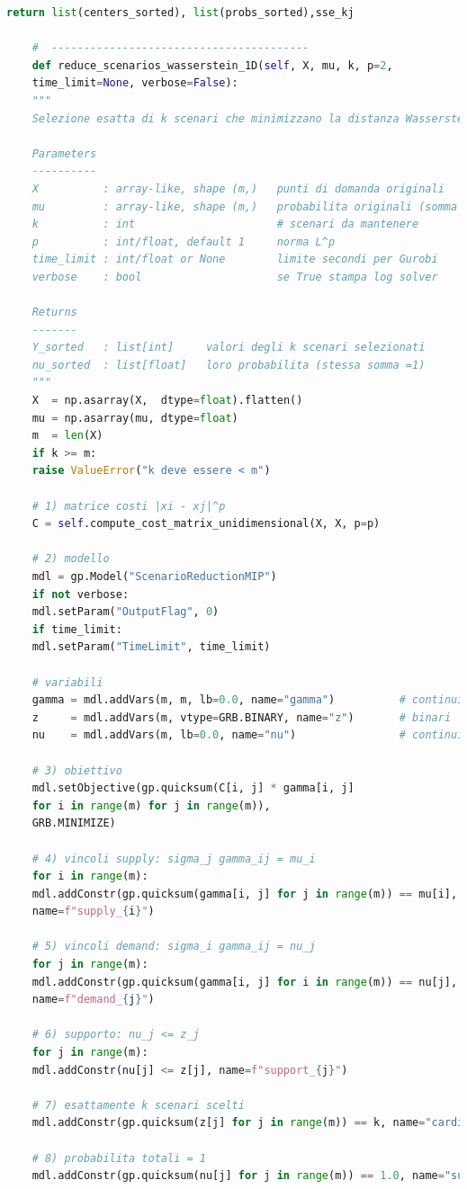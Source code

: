 \documentclass[a4paper,12pt]{article}
\begin{document}
\begin{lstlisting}[language=python,caption={class ScenarioTree},label={lst:class-scenario-tree}]
	return list(centers_sorted), list(probs_sorted),sse_kj
	
	#  ----------------------------------------
	def reduce_scenarios_wasserstein_1D(self, X, mu, k, p=2,
	time_limit=None, verbose=False):
	"""
	Selezione esatta di k scenari che minimizzano la distanza Wasserstein (1-D).
	
	Parameters
	----------
	X          : array-like, shape (m,)   punti di domanda originali
	mu         : array-like, shape (m,)   probabilita originali (somma = 1)
	k          : int                      # scenari da mantenere
	p          : int/float, default 1     norma L^p 
	time_limit : int/float or None        limite secondi per Gurobi
	verbose    : bool                     se True stampa log solver
	
	Returns
	-------
	Y_sorted   : list[int]     valori degli k scenari selezionati
	nu_sorted  : list[float]   loro probabilita (stessa somma =1)
	"""
	X  = np.asarray(X,  dtype=float).flatten()
	mu = np.asarray(mu, dtype=float)
	m  = len(X)
	if k >= m:
	raise ValueError("k deve essere < m")
	
	# 1) matrice costi |xi - xj|^p
	C = self.compute_cost_matrix_unidimensional(X, X, p=p)
	
	# 2) modello 
	mdl = gp.Model("ScenarioReductionMIP")
	if not verbose:
	mdl.setParam("OutputFlag", 0)
	if time_limit:
	mdl.setParam("TimeLimit", time_limit)
	
	# variabili
	gamma = mdl.addVars(m, m, lb=0.0, name="gamma")          # continui
	z     = mdl.addVars(m, vtype=GRB.BINARY, name="z")       # binari
	nu    = mdl.addVars(m, lb=0.0, name="nu")                # continui
	
	# 3) obiettivo
	mdl.setObjective(gp.quicksum(C[i, j] * gamma[i, j]
	for i in range(m) for j in range(m)),
	GRB.MINIMIZE)
	
	# 4) vincoli supply: sigma_j gamma_ij = mu_i
	for i in range(m):
	mdl.addConstr(gp.quicksum(gamma[i, j] for j in range(m)) == mu[i],
	name=f"supply_{i}")
	
	# 5) vincoli demand: sigma_i gamma_ij = nu_j
	for j in range(m):
	mdl.addConstr(gp.quicksum(gamma[i, j] for i in range(m)) == nu[j],
	name=f"demand_{j}")
	
	# 6) supporto: nu_j <= z_j
	for j in range(m):
	mdl.addConstr(nu[j] <= z[j], name=f"support_{j}")
	
	# 7) esattamente k scenari scelti
	mdl.addConstr(gp.quicksum(z[j] for j in range(m)) == k, name="cardinality")
	
	# 8) probabilita totali = 1
	mdl.addConstr(gp.quicksum(nu[j] for j in range(m)) == 1.0, name="sum_prob")
	

\end{lstlisting}
\end{document}
